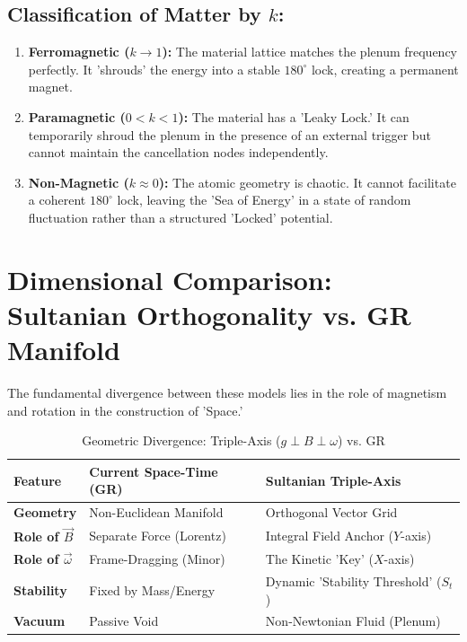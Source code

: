 \documentclass[11pt]{article}
\begin{document}
\subsection*{Classification of Matter by $k$:}
\begin{enumerate}
    \item \textbf{Ferromagnetic ($k \to 1$):} The material lattice matches the plenum frequency perfectly. It 'shrouds' the energy into a stable $180^\circ$ lock, creating a permanent magnet.
    \item \textbf{Paramagnetic ($0 < k < 1$):} The material has a 'Leaky Lock.' It can temporarily shroud the plenum in the presence of an external trigger but cannot maintain the cancellation nodes independently.
    \item \textbf{Non-Magnetic ($k \approx 0$):} The atomic geometry is chaotic. It cannot facilitate a coherent $180^\circ$ lock, leaving the 'Sea of Energy' in a state of random fluctuation rather than a structured 'Locked' potential.
\end{enumerate}

\section{Dimensional Comparison: Sultanian Orthogonality vs. GR Manifold}

The fundamental divergence between these models lies in the role of magnetism and rotation in the construction of 'Space.'

\begin{table}[h!]
\centering
\caption{Geometric Divergence: Triple-Axis ($g \perp B \perp \omega$) vs. GR}
\label{tab:triple_axis_comp}
\begin{tabular}{@{}lll@{}}
\toprule
\textbf{Feature} & \textbf{Current Space-Time (GR)} & \textbf{Sultanian Triple-Axis} \\ \midrule
\textbf{Geometry} & Non-Euclidean Manifold & Orthogonal Vector Grid \\
\textbf{Role of $\vec{B}$} & Separate Force (Lorentz) & Integral Field Anchor ($Y$-axis) \\
\textbf{Role of $\vec{\omega}$} & Frame-Dragging (Minor) & The Kinetic 'Key' ($X$-axis) \\
\textbf{Stability} & Fixed by Mass/Energy & Dynamic 'Stability Threshold' ($S_t$) \\
\textbf{Vacuum} & Passive Void & Non-Newtonian Fluid (Plenum) \\
\bottomrule
\end{tabular}
\end{table}
\end{document}
